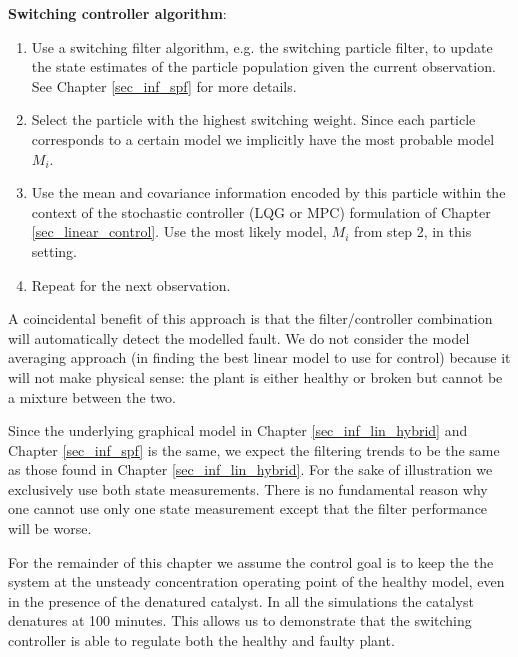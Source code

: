 \textbf{Switching controller algorithm}:
\begin{enumerate}
\item
Use a switching filter algorithm, e.g. the switching particle filter, to update the state estimates of the particle population given the current observation. See Chapter \ref{sec_inf_spf} for more details.
\item
Select the particle with the highest switching weight. Since each particle corresponds to a certain model we implicitly have the most probable model $M_i$.
\item
Use the mean and covariance information encoded by this particle within the context of the stochastic controller (LQG or MPC) formulation of Chapter \ref{sec_linear_control}. Use the most likely model, $M_i$ from step 2, in this setting.
\item
Repeat for the next observation. 
\end{enumerate} 
A coincidental benefit of this approach is that the filter/controller combination will automatically detect the modelled fault. We do not consider the model averaging approach (in finding the best linear model to use for control) because it will not make physical sense: the plant is either healthy or broken but cannot be a mixture between the two.

Since the underlying graphical model in Chapter \ref{sec_inf_lin_hybrid} and Chapter \ref{sec_inf_spf} is the same, we expect the filtering trends to be the same as those found in Chapter \ref{sec_inf_lin_hybrid}. For the sake of illustration we exclusively use both state measurements. There is no fundamental reason why one cannot use only one state measurement except that the filter performance will be worse.

For the remainder of this chapter we assume the control goal is to keep the the system at the unsteady concentration operating point of the healthy model, even in the presence of the denatured catalyst. In all the simulations the catalyst denatures at 100 minutes. This allows us to demonstrate that the switching controller is able to regulate both the healthy and faulty plant. 

